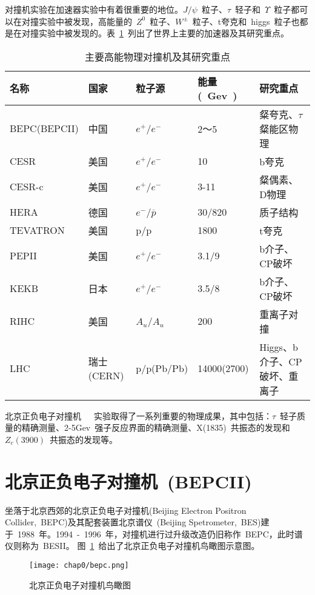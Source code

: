 对撞机实验在加速器实验中有着很重要的地位。$J/\psi$~粒子、$\tau$~轻子和~$\Upsilon$~粒子都可以在对撞实验中被发现，高能量的~$Z^{0}$~粒子、$W^{\pm}$~粒子、t夸克和~higgs~粒子也都是在对撞实验中被发现的。表~\ref{tbl:collider-accelerator}~列出了世界上主要的加速器及其研究重点。

\begin{table}[h]
    \centering
    \caption{\label{tbl:collider-accelerator} 主要高能物理对撞机及其研究重点}
    \footnotesize
    \begin{tabular}{lllll}
        \hline
        名称& 国家& 粒子源& 能量(~Gev~)& 研究重点\\
        \hline
        BEPC(BEPCII)& 中国& $e^{+}$/$e^{-}$& 2～5& 粲夸克、$\tau$粲能区物理 \\
        CESR& 美国& $e^{+}$/$e^{-}$& 10& b夸克 \\
        CESR-c& 美国& $e^{+}$/$e^{-}$& 3-11& 粲偶素、D物理 \\
        HERA& 德国&  $e^{-}$/$\overline{p}$&30/820& 质子结构\\
        TEVATRON& 美国& p/p&1800& t夸克\\
        PEPII& 美国& $e^{+}$/$e^{-}$& 3.1/9& b介子、CP破坏\\
        KEKB& 日本&   $e^{+}$/$e^{-}$& 3.5/8& b介子、CP破坏\\
        RIHC& 美国& $A_{u}$/$A_{u}$& 200& 重离子对撞\\
        LHC& 瑞士(CERN)& p/p(Pb/Pb)& 14000(2700)& Higgs、b介子、CP破坏、重离子\\
        \hline
    \end{tabular}
\end{table}

北京正负电子对撞机~\cite{xiejl1996}~\cite{ihep:2003}~\cite{ihep:2006}实验取得了一系列重要的物理成果，其中包括：$\tau$~轻子质量的精确测量、2-5Gev~强子反应界面的精确测量、X(1835)~共振态的发现和~$Z_{c}(3900)$~\cite{BESIII:2013}共振态的发现等。

\section{北京正负电子对撞机~(BEPCII)~}

坐落于北京西郊的北京正负电子对撞机(Beijing Electron Positron Collider,~BEPC)及其配套装置北京谱仪~\cite{zhengzp2009}(Beijing Spetrometer,~BES)建于~1988~年。1994~-~1996~年，对撞机进行过升级改造仍旧称作~BEPC，此时谱仪则称为~BESII。
图~\ref{fig:bepc}~给出了北京正负电子对撞机鸟瞰图示意图。
\begin{figure}[!h]
  \centering
  \texttt{[image: chap0/bepc.png]}
  \caption{北京正负电子对撞机鸟瞰图}
  \label{fig:bepc}
\end{figure}

